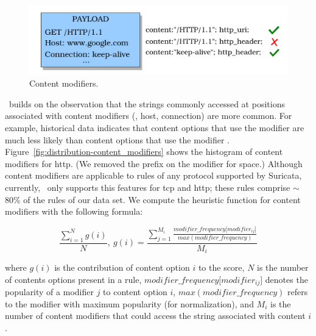 \documentclass[conference]{IEEEtran}
\begin{document}
\begin{figure}[t!]
\centering
\includegraphics[scale=0.5]{figs/http_header-example.png}
\vspace{-2ex}
\caption{Content modifiers.}
\label{fig:http-header-example}
\end{figure}

\tname\ builds on the observation that the strings commonly accessed
at positions associated with content modifiers (\eg{}, host,
connection) are more common. For example, historical data indicates
that content options that use the modifier  are
much less likely than content options that use the modifier
. Figure~\ref{fig:distribution-content_modifiers} shows
the histogram of content modifiers for http. (We removed the prefix
 on the modifier for space.) Although content modifiers
are applicable to rules of any protocol supported by Suricata,
currently, \tname\ only supports this features for tcp and http; these
rules comprise $\sim$80\% of the rules of our data set. We compute the
heuristic function for content modifiers with the following formula:

\[\frac{\sum_{i=1}^{N}g(i)}{N},~g(i)=\frac{\sum_{j=1}^{M_i}\frac{\mathit{modifier\_frequency[modifier_{ij}}]}{\mathit{max(modifier\_frequency)}}}{M_i}\]

\noindent
where $g(i)$ is the contribution of content option $i$ to the score,
$N$ is the number of contents options present in a rule,
$\mathit{modifier\_frequency[modifier_{ij}}]$ denotes the popularity
of a modifier $j$ to content option $i$,
$\mathit{max(modifier\_frequency)}$ refers to the modifier with
maximum popularity (for normalization), and $M_i$ is the number of
content modifiers that could access the string associated with content
$i$.
    
\end{document}

